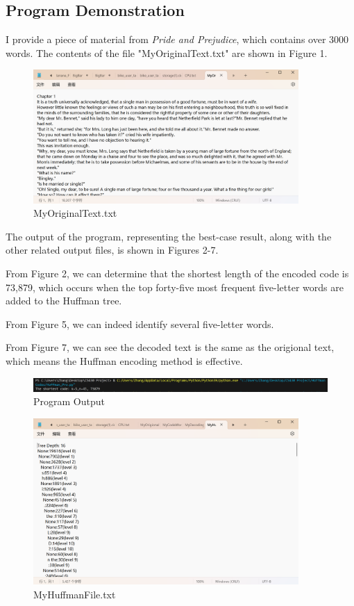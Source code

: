 \documentclass[12pt]{article}
\begin{document}
\subsection{Program Demonstration}
I provide a piece of material from \textit{Pride and Prejudice}, which contains over 3000 words. The contents of the file "MyOriginalText.txt" are shown in Figure 1.
\begin{figure}[htbp]
    \centering
    \includegraphics[width=0.9\textwidth]{input.png}
    \caption{MyOriginalText.txt}
    \label{pic1}
\end{figure}
\par The output of the program, representing the best-case result, along with the other related output files, is shown in Figures 2-7.
\par From Figure 2, we can determine that the shortest length of the encoded code is 73,879, which occurs when the top forty-five most frequent five-letter words are added to the Huffman tree.
\par From Figure 5, we can indeed identify several five-letter words.
\par From Figure 7, we can see the decoded text is the same as the origional text, which means the Huffman encoding method is effective.
\begin{figure}[htbp]
    \centering
    \includegraphics[width=\textwidth]{output.png}
    \caption{Program Output}
    \label{pic2}
\end{figure}

\begin{figure}[htbp]
    \centering
    \includegraphics[width=0.9\textwidth]{tree.png}
    \caption{MyHuffmanFile.txt}
    \label{pic3}
\end{figure}
\end{document}
